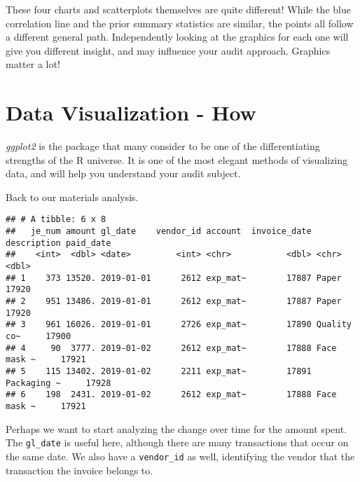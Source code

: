 \documentclass[
]{book}
\newenvironment{Shaded}{\begin{snugshade}}{\end{snugshade}}
\newcommand{\KeywordTok}[1]{\textcolor[rgb]{0.13,0.29,0.53}{\textbf{#1}}}
\newcommand{\NormalTok}[1]{#1}
\newcommand{\OperatorTok}[1]{\textcolor[rgb]{0.81,0.36,0.00}{\textbf{#1}}}
\newcommand{\StringTok}[1]{\textcolor[rgb]{0.31,0.60,0.02}{#1}}
\begin{document}
These four charts and scatterplots themselves are quite different! While the blue correlation line and the prior summary statistics are similar, the points all follow a different general path. Independently looking at the graphics for each one will give you different insight, and may influence your audit approach. Graphics matter a lot!

\hypertarget{data-visualization---how}{%
\section{Data Visualization - How}\label{data-visualization---how}}

\emph{ggplot2} is the package that many consider to be one of the differentiating strengths of the R universe. It is one of the most elegant methods of visualizing data, and will help you understand your audit subject.

Back to our materials analysis.

\begin{Shaded}
\end{Shaded}

\begin{verbatim}
## # A tibble: 6 x 8
##   je_num amount gl_date    vendor_id account  invoice_date description paid_date
##    <int>  <dbl> <date>         <int> <chr>           <dbl> <chr>           <dbl>
## 1    373 13520. 2019-01-01      2612 exp_mat~        17887 Paper           17920
## 2    951 13486. 2019-01-01      2612 exp_mat~        17887 Paper           17920
## 3    961 16026. 2019-01-01      2726 exp_mat~        17890 Quality co~     17900
## 4     90  3777. 2019-01-02      2612 exp_mat~        17888 Face mask ~     17921
## 5    115 13402. 2019-01-02      2211 exp_mat~        17891 Packaging ~     17928
## 6    198  2431. 2019-01-02      2612 exp_mat~        17888 Face mask ~     17921
\end{verbatim}

Perhaps we want to start analyzing the change over time for the amount spent. The \texttt{gl\_date} is useful here, although there are many transactions that occur on the same date. We also have a \texttt{vendor\_id} as well, identifying the vendor that the transaction the invoice belongs to.
\end{document}
